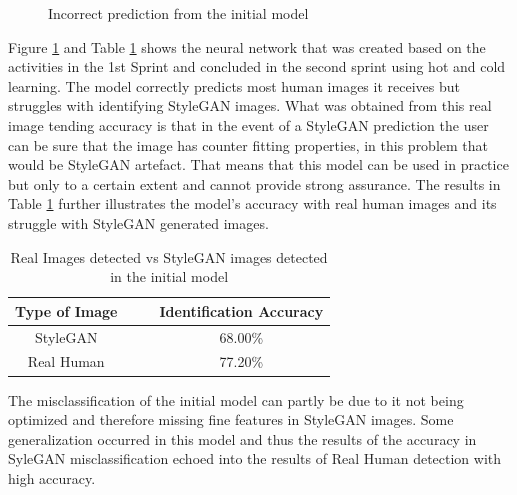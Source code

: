 \begin{figure}[H]%
\centering
{}%
\caption{Incorrect prediction from the initial model}%
\label{fig:reswrong}%
\end{figure}

Figure \ref{fig:reswrong}  and Table \ref{tabl:res1} shows the neural network that was created based on the activities in the 1st Sprint and concluded in the second sprint using hot and cold learning. The model correctly predicts most human images it receives but struggles with identifying StyleGAN images. What was obtained from this real image tending accuracy is that in the event of a StyleGAN prediction the user can be sure that the image has counter fitting properties, in this problem that would be StyleGAN artefact. That means that this model can be used in practice but only to a certain extent and cannot provide strong assurance. The results in Table \ref{tabl:res1} further illustrates the model's accuracy with real human images and its struggle with StyleGAN generated images.

\begin{table}[!htbp!]%
\caption{Real Images detected vs StyleGAN images detected in the initial model}
\label{tabl:res1}
\centering
\large
\begin{tabular}{cccc}
\hline
Type of Image & & & Identification Accuracy  \\ 
\hline
StyleGAN & & & 68.00\% \\
Real Human & & & 77.20\% \\
\hline
\end{tabular}

\end{table} 

The misclassification of the initial model can partly be due to it not being optimized and therefore missing fine features in StyleGAN images. Some generalization occurred in this model and thus the results of the accuracy in SyleGAN misclassification echoed into the results of Real Human detection with high accuracy.

